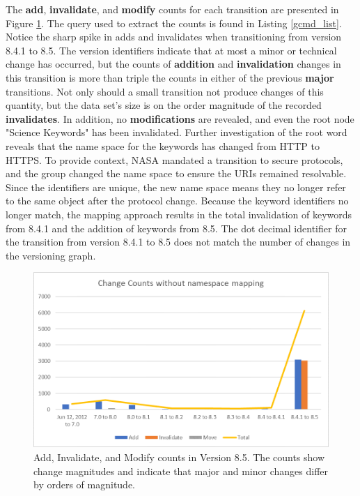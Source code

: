 The \textbf{add}, \textbf{invalidate}, and \textbf{modify} counts for each transition are presented in Figure \ref{GCMDC1}.
The query used to extract the counts is found in Listing \ref{gcmd_list}.
Notice the sharp spike in adds and invalidates when transitioning from version 8.4.1 to 8.5.
The version identifiers indicate that at most a minor or technical change has occurred, but the counts of \textbf{addition} and \textbf{invalidation} changes in this transition is more than triple the counts in either of the previous \textbf{major} transitions.
Not only should a small transition not produce changes of this quantity, but the data set's size is on the order magnitude of the recorded \textbf{invalidates}.
In addition, no \textbf{modifications} are revealed, and even the root node "Science Keywords" has been invalidated.
Further investigation of the root word reveals that the name space for the keywords has changed from HTTP to HTTPS.
To provide context, NASA mandated a transition to secure protocols, and the group changed the name space to ensure the URIs remained resolvable.
Since the identifiers are unique, the new name space means they no longer refer to the same object after the protocol change.
Because the keyword identifiers no longer match, the mapping approach results in the total invalidation of keywords from 8.4.1 and the addition of keywords from 8.5.
The dot decimal identifier for the transition from version 8.4.1 to 8.5 does not match the number of changes in the versioning graph.

\begin{figure}[b]
	\centering
	\includegraphics[scale=1]{figures/GCMDChart1.png}
	\caption{Add, Invalidate, and Modify counts in Version 8.5.  The counts show change magnitudes and indicate that major and minor changes differ by orders of magnitude.}
	\label{GCMDC1}
\end{figure}

